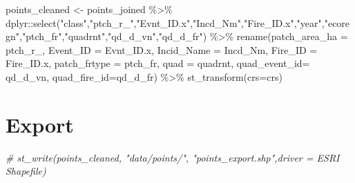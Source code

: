 \documentclass[
]{book}
\newenvironment{Shaded}{\begin{snugshade}}{\end{snugshade}}
\newcommand{\AttributeTok}[1]{\textcolor[rgb]{0.77,0.63,0.00}{#1}}
\newcommand{\CommentTok}[1]{\textcolor[rgb]{0.56,0.35,0.01}{\textit{#1}}}
\newcommand{\FunctionTok}[1]{\textcolor[rgb]{0.00,0.00,0.00}{#1}}
\newcommand{\NormalTok}[1]{#1}
\newcommand{\OtherTok}[1]{\textcolor[rgb]{0.56,0.35,0.01}{#1}}
\newcommand{\SpecialCharTok}[1]{\textcolor[rgb]{0.00,0.00,0.00}{#1}}
\newcommand{\StringTok}[1]{\textcolor[rgb]{0.31,0.60,0.02}{#1}}
\begin{document}
\begin{Shaded}
\begin{Highlighting}[]
\NormalTok{points\_cleaned }\OtherTok{\textless{}{-}}\NormalTok{ points\_joined }\SpecialCharTok{\%\textgreater{}\%} 
\NormalTok{  dplyr}\SpecialCharTok{::}\FunctionTok{select}\NormalTok{(}\StringTok{"class"}\NormalTok{,}\StringTok{"ptch\_r\_"}\NormalTok{,}\StringTok{"Evnt\_ID.x"}\NormalTok{,}\StringTok{"Incd\_Nm"}\NormalTok{,}\StringTok{"Fire\_ID.x"}\NormalTok{,}\StringTok{"year"}\NormalTok{,}\StringTok{"ecoregn"}\NormalTok{,}\StringTok{"ptch\_fr"}\NormalTok{,}\StringTok{"quadrnt"}\NormalTok{,}\StringTok{"qd\_d\_vn"}\NormalTok{,}\StringTok{"qd\_d\_fr"}\NormalTok{) }\SpecialCharTok{\%\textgreater{}\%} 
  \FunctionTok{rename}\NormalTok{(}\AttributeTok{patch\_area\_ha =}\NormalTok{ ptch\_r\_,}
         \AttributeTok{Event\_ID =}\NormalTok{ Evnt\_ID.x,}
         \AttributeTok{Incid\_Name =}\NormalTok{ Incd\_Nm,}
         \AttributeTok{Fire\_ID =}\NormalTok{ Fire\_ID.x,}
         \AttributeTok{patch\_frtype =}\NormalTok{ ptch\_fr,}
         \AttributeTok{quad =}\NormalTok{ quadrnt,}
         \AttributeTok{quad\_event\_id=}\NormalTok{ qd\_d\_vn,}
         \AttributeTok{quad\_fire\_id=}\NormalTok{qd\_d\_fr) }\SpecialCharTok{\%\textgreater{}\%} 
  \FunctionTok{st\_transform}\NormalTok{(}\AttributeTok{crs=}\NormalTok{crs)}
\end{Highlighting}
\end{Shaded}

\hypertarget{export-1}{%
\chapter{Export}\label{export-1}}

\begin{Shaded}
\begin{Highlighting}[]
\CommentTok{\# st\_write(points\_cleaned, "data/points/", "points\_export.shp",driver = \textquotesingle{}ESRI Shapefile\textquotesingle{})}
\end{Highlighting}
\end{Shaded}


  
\end{document}
